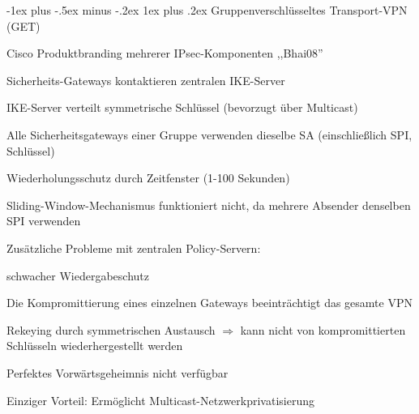 \documentclass[a4paper]{article}
\makeatletter
\renewcommand{\subsubsection}{\@startsection{subsubsection}{3}{0mm}%
 {-1ex plus -.5ex minus -.2ex}%
 {1ex plus .2ex}%
 {\normalfont\small\bfseries}}
\makeatother
\begin{document}
\begin{multicols}{3}
\begin{itemize*}
            \subsubsection{Gruppenverschlüsseltes Transport-VPN
                  (GET)}
            \begin{itemize*}
                  \item Cisco Produktbranding mehrerer IPsec-Komponenten ,,Bhai08''
                  \item Sicherheits-Gateways kontaktieren zentralen IKE-Server
                  \item IKE-Server verteilt symmetrische Schlüssel (bevorzugt über Multicast)
                  \item Alle Sicherheitsgateways einer Gruppe verwenden dieselbe SA
                  (einschließlich SPI, Schlüssel)
                  \item Wiederholungsschutz durch Zeitfenster (1-100 Sekunden)
                  \begin{itemize*}
                        \item Sliding-Window-Mechanismus funktioniert nicht, da mehrere Absender denselben SPI verwenden
                  \end{itemize*}
                  \item Zusätzliche Probleme mit zentralen Policy-Servern:
                  \begin{itemize*}
                        \item schwacher Wiedergabeschutz
                        \item Die Kompromittierung eines einzelnen Gateways beeinträchtigt das gesamte VPN
                        \item Rekeying durch symmetrischen Austausch $\Rightarrow$ kann nicht von kompromittierten Schlüsseln wiederhergestellt werden
                        \item Perfektes Vorwärtsgeheimnis nicht verfügbar
                  \end{itemize*}
                  \item Einziger Vorteil: Ermöglicht Multicast-Netzwerkprivatisierung
            \end{itemize*}


\end{itemize*}
\end{multicols}
\end{document}
